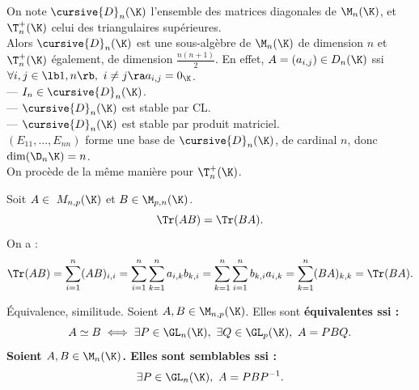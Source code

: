 \documentclass[11pt]{article}
\begin{document}
\begin{prop}{}{}
    On note $\cursive{D}_n(\K)$ l'ensemble des matrices diagonales de $\M_n(\K)$, et $\T_n^+(\K)$ celui des triangulaires supérieures.\\
    Alors $\cursive{D}_n(\K)$ est une sous-algèbre de $\M_n(\K)$ de dimension $n$ et $\T_n^+(\K)$ également, de dimension $\frac{n(n+1)}{2}$.
    \tcblower
    En effet, $A=(a_{i,j})\in D_n(\K)$ ssi $\forall i,j\in\lb1,n\rb, ~ i\neq j \ra a_{i,j}=0_{\K}$.\\
    --- $I_n\in \cursive{D}_n(\K)$.\\
    --- $\cursive{D}_n(\K)$ est stable par CL.\\
    --- $\cursive{D}_n(\K)$ est stable par produit matriciel.\\
    $(E_{11},...,E_{nn})$ forme une base de $\cursive{D}_n(\K)$, de cardinal $n$, donc $\dim(\D_n\K)=n$.\\
    On procède de la même manière pour $\T_n^+(\K)$.
\end{prop}

\vspace*{-0.7cm}

\begin{prop}{}{}
    Soit $A\in\ M_{n,p}(\K)$ et $B\in \M_{p,n}(\K)$.
    \begin{equation*}
        \Tr(AB)=\Tr(BA).
    \end{equation*}
    \tcblower
    On a :
    \begin{equation*}
        \Tr(AB)=\sum_{i=1}^n(AB)_{i,i}=\sum_{i=1}^n\sum_{k=1}^na_{i,k}b_{k,i}=\sum_{k=1}^n\sum_{i=1}^nb_{k,i}a_{i,k}=\sum_{k=1}^n(BA)_{k,k}=\Tr(BA).
    \end{equation*}
\end{prop}

\begin{defi}{Équivalence, similitude.}{}
    Soient $A,B\in \M_{n,p}(\K)$. Elles sont \bf{équivalentes} ssi :
    \begin{equation*}
        A \simeq B \iff \exists P \in \GL_n(\K), ~ \exists Q \in \GL_p(\K), ~ A = PBQ.
    \end{equation*}
    Soient $A,B\in\M_n(\K)$. Elles sont \bf{semblables} ssi :
    \begin{equation*}
        \exists P \in \GL_n(\K), ~ A = PBP^{-1}.
    \end{equation*}
\end{defi}

\vspace*{-0.7cm}
\end{document}
